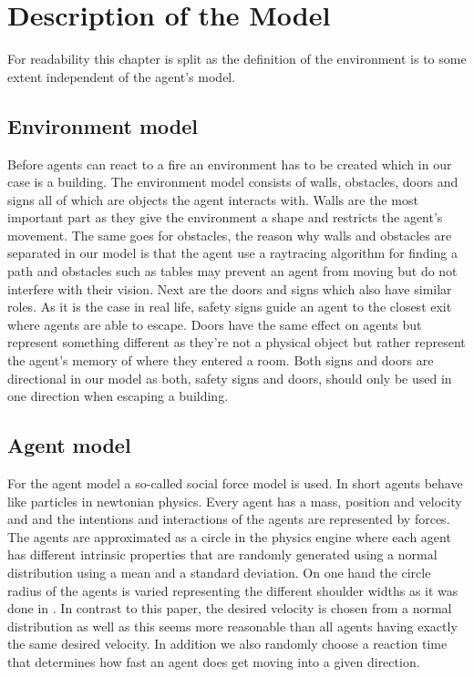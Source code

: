 \documentclass[11pt]{article}
\begin{document}
\section{Description of the Model}

For readability this chapter is split as the definition of the environment is to some extent independent of the agent's model.

\subsection{Environment model}

Before agents can react to a fire an environment has to be created which in our case is a building. The environment model consists of walls, obstacles, doors and signs all of which are objects the agent interacts with. Walls are the most important part as they give the environment a shape and restricts the agent's movement. The same goes for obstacles, the reason why walls and obstacles are separated in our model is that the agent use a raytracing algorithm for finding a path and obstacles such as tables may prevent an agent from moving but do not interfere with their vision. Next are the doors and signs which also have similar roles. As it is the case in real life, safety signs guide an agent to the closest exit where agents are able to escape. Doors have the same effect on agents but represent something different as they're not a physical object but rather represent the agent's memory of where they entered a room. Both signs and doors are directional in our model as both, safety signs and doors, should only be used in one direction when escaping a building.

\subsection{Agent model}
For the agent model a so-called social force model is used. In short agents behave like particles in newtonian physics. Every agent has a mass, position and velocity and and the intentions and interactions of the agents are represented by forces. The agents are approximated as a circle in the physics engine where each agent has different intrinsic properties that are randomly generated using a normal distribution using a mean and a standard deviation. On one hand the circle radius of the agents is varied representing the different shoulder widths as it was done in \cite{Helbing}. In contrast to this paper, the desired velocity is chosen from a normal distribution as well as this seems more reasonable than all agents having exactly the same desired velocity. In addition we also randomly choose a reaction time that determines how fast an agent does get moving into a given direction.
\end{document}
